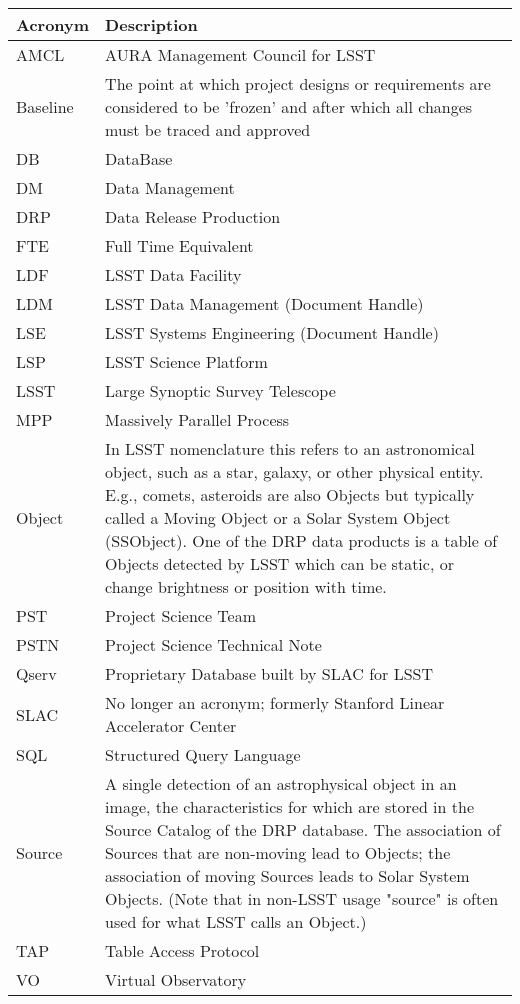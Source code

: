 \addtocounter{table}{-1}
\begin{longtable}{|l|p{}|}\hline
\textbf{Acronym} & \textbf{Description}  \\\hline

AMCL & AURA Management Council for LSST \\\hline
Baseline & The point at which project designs or requirements are considered to be 'frozen' and after which all changes must be traced and approved \\\hline
DB & DataBase \\\hline
DM & Data Management \\\hline
DRP & Data Release Production \\\hline
FTE & Full Time Equivalent \\\hline
LDF & LSST Data Facility \\\hline
LDM & LSST Data Management (Document Handle) \\\hline
LSE & LSST Systems Engineering (Document Handle) \\\hline
LSP & LSST Science Platform \\\hline
LSST & Large Synoptic Survey Telescope \\\hline
MPP & Massively Parallel Process \\\hline
Object & In LSST nomenclature this refers to an astronomical object, such as a star, galaxy, or other physical entity. E.g., comets, asteroids are also Objects but typically called a Moving Object or a Solar System Object (SSObject). One of the DRP data products is a table of Objects detected by LSST which can be static, or change brightness or position with time. \\\hline
PST & Project Science Team \\\hline
PSTN & Project Science Technical Note \\\hline
Qserv & Proprietary Database built by SLAC for LSST \\\hline
SLAC & No longer an acronym; formerly Stanford Linear Accelerator Center \\\hline
SQL & Structured Query Language \\\hline
Source & A single detection of an astrophysical object in an image, the characteristics for which are stored in the Source Catalog of the DRP database. The association of Sources that are non-moving lead to Objects; the association of moving Sources leads to Solar System Objects. (Note that in non-LSST usage "source" is often used for what LSST calls an Object.) \\\hline
TAP & Table Access Protocol \\\hline
VO & Virtual Observatory \\\hline
\end{longtable}
